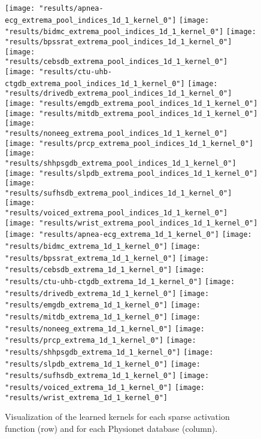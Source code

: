 \documentclass[journal]{IEEEtran}
\begin{document}
\begin{figure*}[!t]
	\texttt{[image: "results/apnea-ecg\_extrema\_pool\_indices\_1d\_1\_kernel\_0"]}
	\texttt{[image: "results/bidmc\_extrema\_pool\_indices\_1d\_1\_kernel\_0"]}
	\texttt{[image: "results/bpssrat\_extrema\_pool\_indices\_1d\_1\_kernel\_0"]}
	\texttt{[image: "results/cebsdb\_extrema\_pool\_indices\_1d\_1\_kernel\_0"]}
	\texttt{[image: "results/ctu-uhb-ctgdb\_extrema\_pool\_indices\_1d\_1\_kernel\_0"]}
	\texttt{[image: "results/drivedb\_extrema\_pool\_indices\_1d\_1\_kernel\_0"]}
	\texttt{[image: "results/emgdb\_extrema\_pool\_indices\_1d\_1\_kernel\_0"]}
	\texttt{[image: "results/mitdb\_extrema\_pool\_indices\_1d\_1\_kernel\_0"]}
	\texttt{[image: "results/noneeg\_extrema\_pool\_indices\_1d\_1\_kernel\_0"]}
	\texttt{[image: "results/prcp\_extrema\_pool\_indices\_1d\_1\_kernel\_0"]}
	\texttt{[image: "results/shhpsgdb\_extrema\_pool\_indices\_1d\_1\_kernel\_0"]}
	\texttt{[image: "results/slpdb\_extrema\_pool\_indices\_1d\_1\_kernel\_0"]}
	\texttt{[image: "results/sufhsdb\_extrema\_pool\_indices\_1d\_1\_kernel\_0"]}
	\texttt{[image: "results/voiced\_extrema\_pool\_indices\_1d\_1\_kernel\_0"]}
	\texttt{[image: "results/wrist\_extrema\_pool\_indices\_1d\_1\_kernel\_0"]}
	\\
	\texttt{[image: "results/apnea-ecg\_extrema\_1d\_1\_kernel\_0"]}
	\texttt{[image: "results/bidmc\_extrema\_1d\_1\_kernel\_0"]}
	\texttt{[image: "results/bpssrat\_extrema\_1d\_1\_kernel\_0"]}
	\texttt{[image: "results/cebsdb\_extrema\_1d\_1\_kernel\_0"]}
	\texttt{[image: "results/ctu-uhb-ctgdb\_extrema\_1d\_1\_kernel\_0"]}
	\texttt{[image: "results/drivedb\_extrema\_1d\_1\_kernel\_0"]}
	\texttt{[image: "results/emgdb\_extrema\_1d\_1\_kernel\_0"]}
	\texttt{[image: "results/mitdb\_extrema\_1d\_1\_kernel\_0"]}
	\texttt{[image: "results/noneeg\_extrema\_1d\_1\_kernel\_0"]}
	\texttt{[image: "results/prcp\_extrema\_1d\_1\_kernel\_0"]}
	\texttt{[image: "results/shhpsgdb\_extrema\_1d\_1\_kernel\_0"]}
	\texttt{[image: "results/slpdb\_extrema\_1d\_1\_kernel\_0"]}
	\texttt{[image: "results/sufhsdb\_extrema\_1d\_1\_kernel\_0"]}
	\texttt{[image: "results/voiced\_extrema\_1d\_1\_kernel\_0"]}
	\texttt{[image: "results/wrist\_extrema\_1d\_1\_kernel\_0"]}
	\caption{Visualization of the learned kernels for each sparse activation function (row) and for each Physionet database (column).
	}
	\label{fig:kernelvisualization}
\end{figure*}
\end{document}
